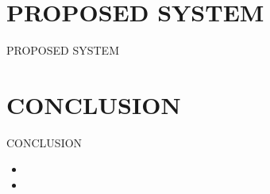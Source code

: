 \documentclass[svgnames,9pt]{beamer}
\begin{document}
\section{PROPOSED SYSTEM} 
\begin{frame}{PROPOSED SYSTEM}

\end{frame}
\section{CONCLUSION}
\begin{frame}{ CONCLUSION }     
\begin{itemize}
Python is the de-facto standard scripting language in both
the open source and proprietary GIS world. Most, if not all,
of the major GIS software systems provide Python libraries
for system integration, analysis, and automation, including
ArcGIS, GeoPandas [GeoP], geoDjango [geoD], GeoServer,
GRASS, PostGIS, pySAL [pySAL], and Shapely [Shp]. Some
of these systems, such as ArcGIS and geoDJango, provide
frameworks for web-based mapping applications different
from the approach we described in the SOFTWARE ENVI-
RONMENT section. While it is outside the scope of this paper
to discuss the merits of these other approaches, we recommend
considering them as alternatives when planning projects.
The examples in this paper include vector and raster data,
as well as code for converting projections, creating buffers,
retrieving features within a specified area, computing areas
and lengths, computing a raster-based model, and exporting
raster results in GeoTIFF format. All examples are written in
Python and run within the OGC-compliant WPS framework
provided by PyWPS.
\item 
\item 
\end{itemize}
\end{frame}
\end{document}
